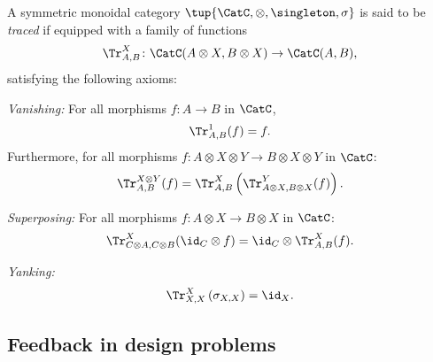 \begin{ctdefinition}
A symmetric monoidal category $\tup{\CatC, \otimes, \singleton, \sigma}$ is said to be \emph{traced} if equipped with a family of functions
\begin{equation}
    \Tr_{A,B}^X\colon \CatC(A\otimes X, B\otimes X)\to \CatC(A,B),
\end{equation}
satisfying the following axioms:
\begin{compactenum}
    \item \emph{Vanishing:} For all morphisms $f\colon A\to B$ in $\CatC$,
    \begin{equation}
    \label{eq:vanishing_1}
    \Tr_{A,B}^1(f)=f.
    \end{equation}
    Furthermore, for all morphisms $f\colon A\otimes X \otimes Y \to B\otimes X \otimes Y$ in $\CatC$:
    \begin{equation}
    \label{eq:vanishing_2}
        \Tr_{A,B}^{X\otimes Y}(f)=\Tr_{A,B}^X\left(
        \Tr_{A\otimes X,B\otimes X}^Y(f)\right).
    \end{equation}
    \item \emph{Superposing:} For all morphisms $f\colon A\otimes X\to B\otimes X$ in $\CatC$:
    \begin{equation}
    \label{eq:superposing}
        \Tr_{C\otimes A,C\otimes B}^{X}(\id_C\otimes f)=\id_C\otimes \Tr_{A,B}^X(f).
    \end{equation}
    \item \emph{Yanking:} 
    \begin{equation}
    \label{eq:yanking}
    \Tr_{X,X}^X\left(\sigma_{X,X}\right)=\id_X.
    \end{equation}
\end{compactenum}
\end{ctdefinition}

\subsection{Feedback in design problems}
\label{sec:feedbackindesign}
